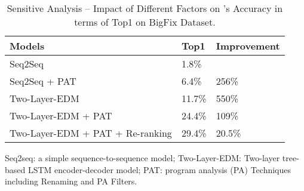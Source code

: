 














\iffalse

\begin{table}[h]
	\caption{Sensitive Analysis -- Impact of Different Factors on {\tool}'s Accuracy in terms of Top1 on BigFix Dataset. 
	}
	\vspace{-10pt}
	\begin{center}
		\renewcommand{\arraystretch}{1} 
		\begin{tabular}{l|p{0.7cm}<{\centering}|p{1.5cm}<{\centering}}
			\hline
			Models & Top1 & Improvement\\
			\hline
			Seq2Seq & 1.8\% & \\
			Seq2Seq + PAT & 6.4\% & 256\% \\ 
			Two-Layer-EDM & 11.7\% & 550\%\\
			Two-Layer-EDM + PAT &  24.4\% &109\%\\
			Two-Layer-EDM + PAT + Re-ranking & 29.4\%&20.5\% \\
			\hline
		\end{tabular}
	Seq2seq: a simple sequence-to-sequence model; Two-Layer-EDM: Two-layer tree-based LSTM encoder-decoder model; 
	PAT: program analysis (PA) Techniques including Renaming and PA Filters.
		\label{RQ3}
	\end{center}
\end{table}

